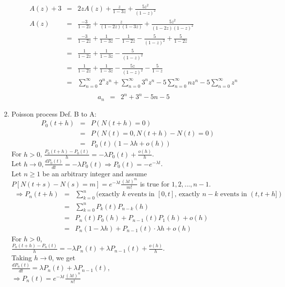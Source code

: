 \documentclass[12pt]{article}
\begin{document}
\begin{enumerate}
\begin{enumerate}
\begin{eqnarray*}
            A(z) + 3 &=& 2zA(z) + \frac{z}{1 - 3z} + \frac{5z^2}{(1 - z) ^ 2} \\
            A(z) &=& \frac{-3}{1 - 2z} + \frac{z}{(1 - 2z)(1 - 3z)} + \frac{5z^2}{(1 - 2z)(1 - z)^2} \\
            &=& \frac{-3}{1 - 2z} + \frac{1}{1 - 3z} - \frac{1}{1 - 2z} - \frac{5}{(1 - z)^2} + \frac{5}{1 - 2z} \\
            &=& \frac{1}{1 - 2z} + \frac{1}{1 - 3z} - \frac{5}{(1 - z)^2} \\
            &=& \frac{1}{1 - 2z} + \frac{1}{1 - 3z} - \frac{5z}{(1 - z)^2} - \frac{5}{1 - z} \\
            &=& \sum_{n=0}^{\infty}2^{n}z^{n} + \sum_{n=0}^{\infty}3^{n}z^{n} - 5\sum_{n=0}^{\infty}nz^{n} - 5\sum_{n=0}^{\infty}z^{n} \\
          \end{eqnarray*}
          \begin{eqnarray*}
            a_{n} &=& 2^{n} + 3^{n} - 5n - 5
          \end{eqnarray*}
      \end{enumerate}
    \item Poisson process Def. B to A:
      \begin{eqnarray*}
        P_{0}(t + h) &=& P(N(t + h) = 0) \\
                     &=& P(N(t) = 0, N(t + h) - N(t) = 0) \\
                     &=& P_{0}(t)(1 - \lambda h + o(h))
      \end{eqnarray*}
      For $h > 0$, $\frac{P_{0}(t + h) - P_{0}(t)}{h} = -\lambda P_{0}(t) + \frac{o(h)}{h}$. \\
      Let $h \rightarrow 0, \frac{dP_{0}(t)}{dt} = -\lambda P_{0}(t) \Rightarrow P_{0}(t) = -e^{-\lambda t}$. \\
      Let $n \geq 1$ be an arbitrary integer and assume $P[N(t + s) - N(s) = m] = e^{-\lambda t}\frac{(\lambda t)^{m}}{m!}$ is true for $1, 2, ..., n - 1$. \\
      \begin{eqnarray*}
      \Rightarrow P_{n}(t + h) &=& \sum_{k=0}^{n}(\text{exactly } k \text{ events in } [0, t]\text{, exactly } n - k \text{ events in } (t, t + h]) \\
      &=& \sum_{k=0}^{n}P_{k}(t)P_{n-k}(h) \\
      &=& P_{n}(t)P_{0}(h) + P_{n-1}(t)P_{1}(h) + o(h) \\
      &=& P_{n}(1 - \lambda h) + P_{n-1}(t)\cdot \lambda h + o(h)
      \end{eqnarray*}
      For $h > 0$, \\
      $\frac{P_{n}(t + h) - P_{n}(t)}{h} = -\lambda P_{n}(t) + \lambda P_{n-1}(t) + \frac{o(h)}{h}$. \\
      Taking $h \rightarrow 0$, we get \\
      $\frac{dP_{n}(t)}{dt} = \lambda P_{n}(t) + \lambda P_{n-1}(t)$, \\
      $\Rightarrow P_{n}(t) = e^{-\lambda t}\frac{(\lambda t)^n}{n!}$
  \end{enumerate}
\end{document}
